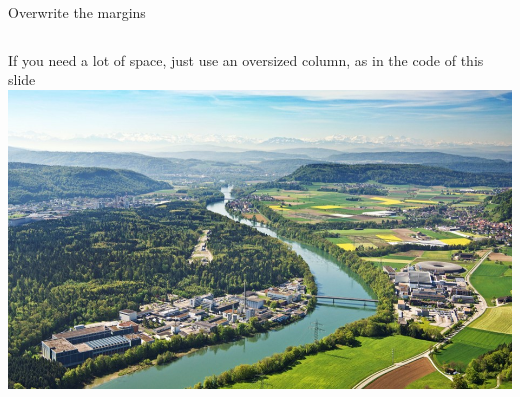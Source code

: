 \documentclass[aspectratio=43]{beamer} %
\begin{document}
\begin{frame}{Overwrite the margins}
\begin{columns}
  \begin{column}{1.2\linewidth}
     If you need a lot of space, just use an oversized column, as in the code of this slide
     \includegraphics[width=\linewidth]{PSIlandscape}
  \end{column}
\end{columns}
\end{frame}

  
\end{document}
